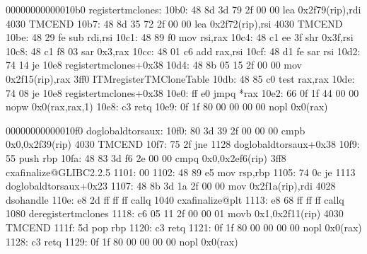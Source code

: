 \documentclass[letterpaper,10pt,spanish]{sphinxmanual}
\begin{document}
\begin{sphinxVerbatim}[commandchars=\\\{\}]
00000000000010b0 \PYGZlt{}register\PYGZus{}tm\PYGZus{}clones\PYGZgt{}:
    10b0:   48 8d 3d 79 2f 00 00    lea    0x2f79(\PYGZpc{}rip),\PYGZpc{}rdi        \PYGZsh{} 4030 \PYGZlt{}\PYGZus{}\PYGZus{}TMC\PYGZus{}END\PYGZus{}\PYGZus{}\PYGZgt{}
    10b7:   48 8d 35 72 2f 00 00    lea    0x2f72(\PYGZpc{}rip),\PYGZpc{}rsi        \PYGZsh{} 4030 \PYGZlt{}\PYGZus{}\PYGZus{}TMC\PYGZus{}END\PYGZus{}\PYGZus{}\PYGZgt{}
    10be:   48 29 fe                sub    \PYGZpc{}rdi,\PYGZpc{}rsi
    10c1:   48 89 f0                mov    \PYGZpc{}rsi,\PYGZpc{}rax
    10c4:   48 c1 ee 3f             shr    \PYGZdl{}0x3f,\PYGZpc{}rsi
    10c8:   48 c1 f8 03             sar    \PYGZdl{}0x3,\PYGZpc{}rax
    10cc:   48 01 c6                add    \PYGZpc{}rax,\PYGZpc{}rsi
    10cf:   48 d1 fe                sar    \PYGZpc{}rsi
    10d2:   74 14                   je     10e8 \PYGZlt{}register\PYGZus{}tm\PYGZus{}clones+0x38\PYGZgt{}
    10d4:   48 8b 05 15 2f 00 00    mov    0x2f15(\PYGZpc{}rip),\PYGZpc{}rax        \PYGZsh{} 3ff0 \PYGZlt{}\PYGZus{}ITM\PYGZus{}registerTMCloneTable\PYGZgt{}
    10db:   48 85 c0                test   \PYGZpc{}rax,\PYGZpc{}rax
    10de:   74 08                   je     10e8 \PYGZlt{}register\PYGZus{}tm\PYGZus{}clones+0x38\PYGZgt{}
    10e0:   ff e0                   jmpq   *\PYGZpc{}rax
    10e2:   66 0f 1f 44 00 00       nopw   0x0(\PYGZpc{}rax,\PYGZpc{}rax,1)
    10e8:   c3                      retq
    10e9:   0f 1f 80 00 00 00 00    nopl   0x0(\PYGZpc{}rax)

00000000000010f0 \PYGZlt{}\PYGZus{}\PYGZus{}do\PYGZus{}global\PYGZus{}dtors\PYGZus{}aux\PYGZgt{}:
    10f0:   80 3d 39 2f 00 00 00    cmpb   \PYGZdl{}0x0,0x2f39(\PYGZpc{}rip)        \PYGZsh{} 4030 \PYGZlt{}\PYGZus{}\PYGZus{}TMC\PYGZus{}END\PYGZus{}\PYGZus{}\PYGZgt{}
    10f7:   75 2f                   jne    1128 \PYGZlt{}\PYGZus{}\PYGZus{}do\PYGZus{}global\PYGZus{}dtors\PYGZus{}aux+0x38\PYGZgt{}
    10f9:   55                      push   \PYGZpc{}rbp
    10fa:   48 83 3d f6 2e 00 00    cmpq   \PYGZdl{}0x0,0x2ef6(\PYGZpc{}rip)        \PYGZsh{} 3ff8 \PYGZlt{}\PYGZus{}\PYGZus{}cxa\PYGZus{}finalize@GLIBC\PYGZus{}2.2.5\PYGZgt{}
    1101:   00
    1102:   48 89 e5                mov    \PYGZpc{}rsp,\PYGZpc{}rbp
    1105:   74 0c                   je     1113 \PYGZlt{}\PYGZus{}\PYGZus{}do\PYGZus{}global\PYGZus{}dtors\PYGZus{}aux+0x23\PYGZgt{}
    1107:   48 8b 3d 1a 2f 00 00    mov    0x2f1a(\PYGZpc{}rip),\PYGZpc{}rdi        \PYGZsh{} 4028 \PYGZlt{}\PYGZus{}\PYGZus{}dso\PYGZus{}handle\PYGZgt{}
    110e:   e8 2d ff ff ff          callq  1040 \PYGZlt{}\PYGZus{}\PYGZus{}cxa\PYGZus{}finalize@plt\PYGZgt{}
    1113:   e8 68 ff ff ff          callq  1080 \PYGZlt{}deregister\PYGZus{}tm\PYGZus{}clones\PYGZgt{}
    1118:   c6 05 11 2f 00 00 01    movb   \PYGZdl{}0x1,0x2f11(\PYGZpc{}rip)        \PYGZsh{} 4030 \PYGZlt{}\PYGZus{}\PYGZus{}TMC\PYGZus{}END\PYGZus{}\PYGZus{}\PYGZgt{}
    111f:   5d                      pop    \PYGZpc{}rbp
    1120:   c3                      retq
    1121:   0f 1f 80 00 00 00 00    nopl   0x0(\PYGZpc{}rax)
    1128:   c3                      retq
    1129:   0f 1f 80 00 00 00 00    nopl   0x0(\PYGZpc{}rax)


\end{sphinxVerbatim}
\end{document}
